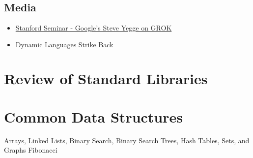 \documentclass[letterpaper]{article}
\begin{document}
\subsection{Media}
 \begin{itemize}
 \item \href{http://www.youtube.com/watch?v=KTJs-0EInW8}{Stanford Seminar - Google's Steve Yegge on GROK}
 \item \href{http://www.youtube.com/watch?v=tz-Bb-D6teE}{Dynamic Languages Strike Back} 
 \end{itemize}
\section{Review of Standard Libraries}

\section{Common Data Structures}
Arrays, Linked Lists, Binary Search, Binary Search Trees, Hash Tables, Sets, and Graphs 
Fibonacci
\end{document}
